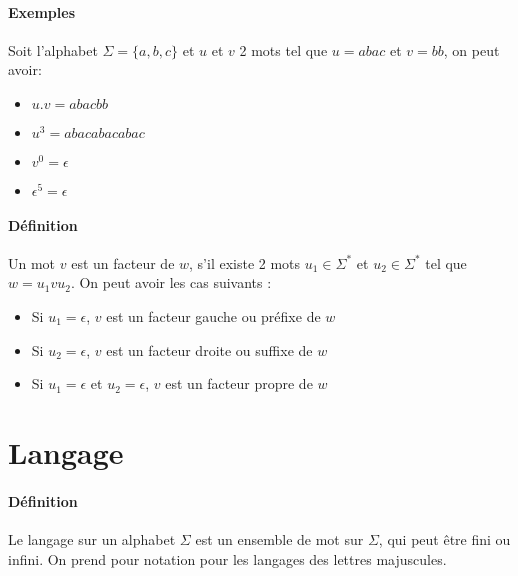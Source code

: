 

\paragraph{Exemples} %
\label{par:exemples}

Soit l'alphabet $\Sigma = \{a,b,c\}$ et $u$ et $v$ 2 mots tel que $u=abac$ et $v=bb$, on peut avoir:
\begin{itemize}
	\item $u.v=abacbb$
	\item $u^3=abacabacabac$
	\item $v^0=\epsilon$
	\item $\epsilon^5=\epsilon$
\end{itemize}



\paragraph{Définition} %
\label{par:d_finition}

Un mot $v$ est un facteur de $w$, s'il existe 2 mots $u_1 \in \Sigma^*$ et $u_2 \in \Sigma^*$ tel que $w=u_1vu_2$. On peut avoir les cas suivants :

\begin{itemize}
	\item Si $u_1=\epsilon$, $v$ est un facteur gauche ou préfixe de $w$
	\item Si $u_2=\epsilon$, $v$ est un facteur droite ou suffixe de $w$
	\item Si $u_1=\epsilon$ et $u_2=\epsilon$, $v$ est un facteur propre de $w$
\end{itemize}





\section{Langage} %
\label{sec:langage}


\paragraph{Définition} %
\label{par:d_finition}

Le langage sur un alphabet $\Sigma$ est un ensemble de mot sur $\Sigma$, qui peut être fini ou infini. On prend pour notation pour les langages des lettres majuscules.

